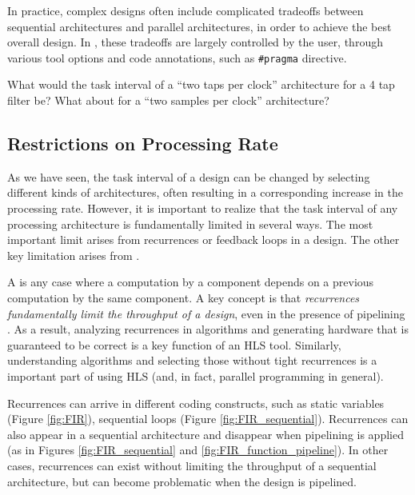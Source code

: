 In practice, complex designs often include complicated tradeoffs between sequential architectures and parallel architectures, in order to achieve the best overall design.  In \VHLS, these tradeoffs are largely controlled by the user, through various tool options and code annotations, such as \lstinline|#pragma| directive.

\begin{exercise}
What would the task interval of a ``two taps per clock'' architecture for a 4 tap filter be?  What about for a ``two samples per clock'' architecture?
\end{exercise}

\subsection{Restrictions on Processing Rate}

As we have seen, the task interval of a design can be changed by selecting different kinds of architectures, often resulting in a corresponding increase in the processing rate.  However, it is important to realize that the task interval of any processing architecture is fundamentally limited in several ways.  The most important limit arises from \glspl{recurrence} or feedback loops in a design.  The other key limitation arises from .


A  is any case where a computation by a component depends on a previous computation by the same component.  A key concept is that {\em recurrences fundamentally limit the throughput of a design}, even in the presence of pipelining \cite{papaefthymiou91,leiserson93}.  As a result, analyzing recurrences in algorithms and generating hardware that is guaranteed to be correct is a key function of an HLS tool.  Similarly, understanding algorithms and selecting those without tight recurrences is a important part of using HLS (and, in fact, parallel programming in general).

Recurrences can arrive in different coding constructs, such as static variables (Figure \ref{fig:FIR}), sequential loops (Figure \ref{fig:FIR_sequential}).  Recurrences can also appear in a sequential architecture and disappear when pipelining is applied (as in Figures \ref{fig:FIR_sequential} and \ref{fig:FIR_function_pipeline}).  In other cases, recurrences can exist without limiting the throughput of a sequential architecture, but can become problematic when the design is pipelined.

